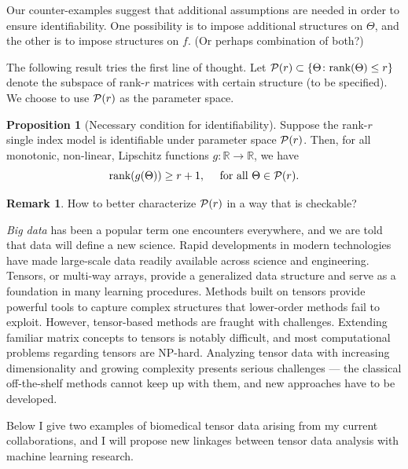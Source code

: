 \documentclass[10pt]{article}
\theoremstyle{definition}
\newtheorem{prop}{Proposition}
\theoremstyle{definition}
\newtheorem{rmk}{Remark}
\theoremstyle{definition}
\begin{document}
\begin{enumerate}
Our counter-examples suggest that additional assumptions are needed in order to ensure identifiability. One possibility is to impose additional structures on $\Theta$, and the other is to impose structures on $f$. (Or perhaps combination of both?)

The following result tries the first line of thought. Let $\mathcal{P}(r)\subset\{\Theta\colon \text{rank}(\Theta)\leq r\}$ denote the subspace of rank-$r$ matrices with certain structure (to be specified). We choose to use $\mathcal{P}(r)$ as the parameter space. 
\begin{prop}[Necessary condition for identifiability]
Suppose the rank-$r$ single index model is identifiable under parameter space $\mathcal{P}(r)$. Then, for all monotonic, non-linear, Lipschitz functions $g\colon \mathbb{R}\to\mathbb{R}$, we have
\[
\text{rank}(g(\Theta))\geq r+1, \quad \text{ for all }\Theta \in \mathcal{P}(r). 
\]
\end{prop}

\begin{rmk} How to better characterize $\mathcal{P}(r)$ in a way that is checkable? 
\end{rmk}


\emph{Big data} has been a popular term one encounters everywhere, and we are told that data will define a new science. Rapid developments in modern technologies have made large-scale data readily available across science and engineering. Tensors, or multi-way arrays, provide a generalized data structure and serve as a foundation in many learning procedures. Methods built on tensors provide powerful tools to capture complex structures that lower-order methods fail to exploit. However, tensor-based methods are fraught with challenges. Extending familiar matrix concepts to tensors is notably difficult, and most computational problems regarding tensors are NP-hard. Analyzing tensor data with increasing dimensionality and growing complexity presents serious challenges --- the classical off-the-shelf methods cannot keep up with them, and new approaches have to be developed. 

Below I give two examples of biomedical tensor data arising from my current collaborations, and I will propose new linkages between tensor data analysis with machine learning research. 


\end{enumerate}
\end{document}
